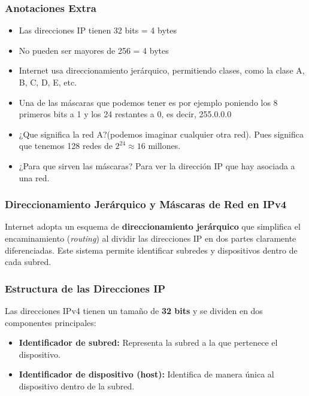 \documentclass[a4paper,12pt]{article}
\begin{document}
\subsubsection*{Anotaciones Extra}

\begin{itemize}
    \item Las direcciones IP tienen 32 bits = 4 bytes
    \item No pueden ser mayores de 256  = 4 bytes
    \item Internet usa direccionamiento jerárquico, permitiendo clases, como la clase A, B, C, D, E, etc.
    \item Una de las máscaras que podemos tener es por ejemplo poniendo los 8 primeros bits a 1 y los 24 restantes a 0, es decir, 255.0.0.0
    \item ¿Que significa la red A?(podemos imaginar cualquier otra red). Pues significa que tenemos 128 redes de $2^{24} \approx 16$ millones.
    \item ¿Para que sirven las máscaras? Para ver la dirección IP que hay asociada a una red.
    
\end{itemize}

\subsubsection{Direccionamiento Jerárquico y Máscaras de Red en IPv4}

Internet adopta un esquema de \textbf{direccionamiento jerárquico} que simplifica el encaminamiento (\textit{routing}) al dividir las direcciones IP en dos partes claramente diferenciadas. Este sistema permite identificar subredes y dispositivos dentro de cada subred.

\subsubsection*{Estructura de las Direcciones IP}

Las direcciones IPv4 tienen un tamaño de \textbf{32 bits} y se dividen en dos componentes principales:
\begin{itemize}
    \item \textbf{Identificador de subred:} Representa la subred a la que pertenece el dispositivo.
    \item \textbf{Identificador de dispositivo (host):} Identifica de manera única al dispositivo dentro de la subred.
\end{itemize}
\end{document}
